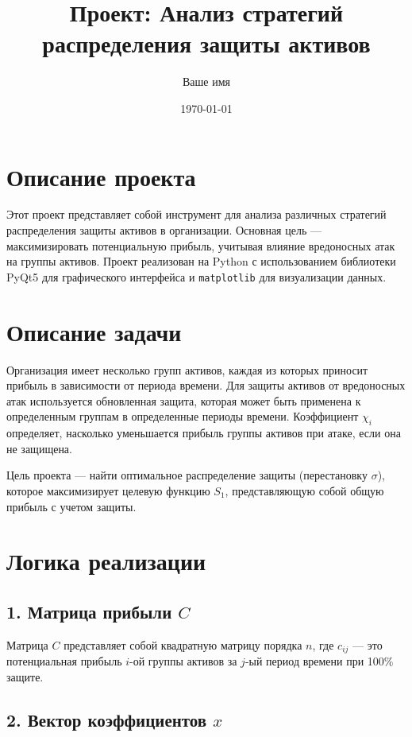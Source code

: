\documentclass{article}
\title{Проект: Анализ стратегий распределения защиты активов}
\author{Ваше имя}
\date{\today}
\begin{document}
\maketitle

\section*{Описание проекта}

Этот проект представляет собой инструмент для анализа различных стратегий распределения защиты активов в организации. Основная цель — максимизировать потенциальную прибыль, учитывая влияние вредоносных атак на группы активов. Проект реализован на Python с использованием библиотеки PyQt5 для графического интерфейса и \texttt{matplotlib} для визуализации данных.

\section*{Описание задачи}

Организация имеет несколько групп активов, каждая из которых приносит прибыль в зависимости от периода времени. Для защиты активов от вредоносных атак используется обновленная защита, которая может быть применена к определенным группам в определенные периоды времени. Коэффициент \( \chi_i \) определяет, насколько уменьшается прибыль группы активов при атаке, если она не защищена.

Цель проекта — найти оптимальное распределение защиты (перестановку \( \sigma \)), которое максимизирует целевую функцию \( S_1 \), представляющую собой общую прибыль с учетом защиты.

\section*{Логика реализации}

\subsection*{1. Матрица прибыли \( C \)}

Матрица \( C \) представляет собой квадратную матрицу порядка \( n \), где \( c_{ij} \) — это потенциальная прибыль \( i \)-ой группы активов за \( j \)-ый период времени при 100\% защите.

\subsection*{2. Вектор коэффициентов \( x \)}
\end{document}
